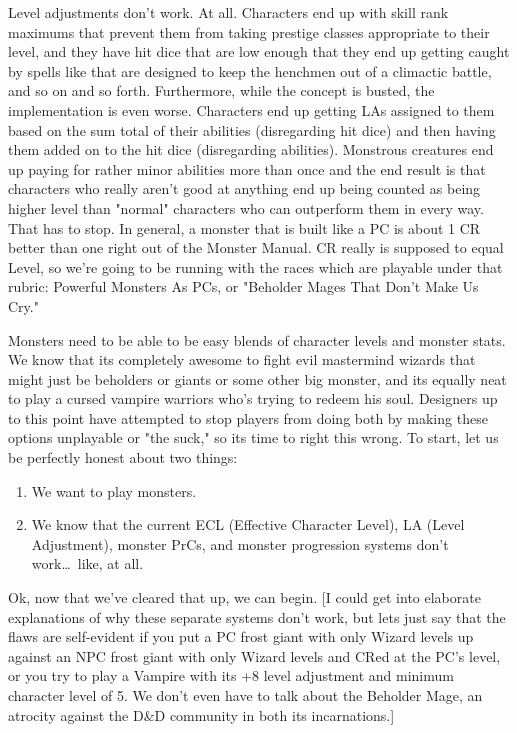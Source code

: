 Level adjustments don't work. At all. Characters end up with skill rank maximums that prevent them from taking prestige classes appropriate to their level, and they have hit dice that are low enough that they end up getting caught by spells like  that are designed to keep the henchmen out of a climactic battle, and so on and so forth. Furthermore, while the concept is busted, the implementation is even worse. Characters end up getting LAs assigned to them based on the sum total of their abilities (disregarding hit dice) and then having them added on to the hit dice (disregarding abilities). Monstrous creatures end up paying for rather minor abilities more than once and the end result is that characters who really aren't good at anything end up being counted as being higher level than "normal" characters who can outperform them in every way. That has to stop. In general, a monster that is built like a PC is about 1 CR better than one right out of the Monster Manual. CR really is supposed to equal Level, so we're going to be running with the races which are playable under that rubric:
Powerful Monsters As PCs, or "Beholder Mages That Don't Make Us Cry."

Monsters need to be able to be easy blends of character levels and monster stats. We know that its completely awesome to fight evil mastermind wizards that might just be beholders or giants or some other big monster, and its equally neat to play a cursed vampire warriors who's trying to redeem his soul. Designers up to this point have attempted to stop players from doing both by making these options unplayable or "the suck," so its time to right this wrong. To start, let us be perfectly honest about two things:

\begin{enumerate}\itemspace
   \item We want to play monsters.
   \item We know that the current ECL (Effective Character Level), LA (Level Adjustment), monster PrCs, and monster progression systems don't work\ldots\  like, at all.
\end{enumerate}

Ok, now that we've cleared that up, we can begin. [I could get into elaborate explanations of why these separate systems don't work, but lets just say that the flaws are self-evident if you put a PC frost giant with only Wizard levels up against an NPC frost giant with only Wizard levels and CRed at the PC's level, or you try to play a Vampire with its +8 level adjustment and minimum character level of 5. We don't even have to talk about the Beholder Mage, an atrocity against the D\&D community in both its incarnations.]

